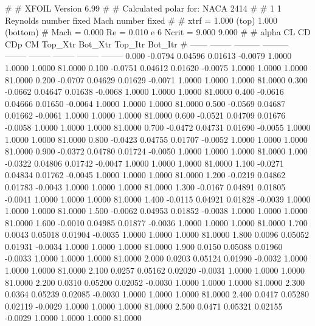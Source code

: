 #  
#       XFOIL         Version 6.99
#  
# Calculated polar for: NACA 2414                                       
#  
# 1 1 Reynolds number fixed          Mach number fixed         
#  
# xtrf =   1.000 (top)        1.000 (bottom)  
# Mach =   0.000     Re =     0.010 e 6     Ncrit =   9.000  9.000
#  
#   alpha    CL        CD       CDp       CM     Top_Xtr  Bot_Xtr  Top_Itr  Bot_Itr
#  ------ -------- --------- --------- -------- -------- -------- -------- --------
   0.000  -0.0794   0.04596   0.01613  -0.0079   1.0000   1.0000   1.0000  81.0000
   0.100  -0.0751   0.04612   0.01620  -0.0075   1.0000   1.0000   1.0000  81.0000
   0.200  -0.0707   0.04629   0.01629  -0.0071   1.0000   1.0000   1.0000  81.0000
   0.300  -0.0662   0.04647   0.01638  -0.0068   1.0000   1.0000   1.0000  81.0000
   0.400  -0.0616   0.04666   0.01650  -0.0064   1.0000   1.0000   1.0000  81.0000
   0.500  -0.0569   0.04687   0.01662  -0.0061   1.0000   1.0000   1.0000  81.0000
   0.600  -0.0521   0.04709   0.01676  -0.0058   1.0000   1.0000   1.0000  81.0000
   0.700  -0.0472   0.04731   0.01690  -0.0055   1.0000   1.0000   1.0000  81.0000
   0.800  -0.0423   0.04755   0.01707  -0.0052   1.0000   1.0000   1.0000  81.0000
   0.900  -0.0372   0.04780   0.01724  -0.0050   1.0000   1.0000   1.0000  81.0000
   1.000  -0.0322   0.04806   0.01742  -0.0047   1.0000   1.0000   1.0000  81.0000
   1.100  -0.0271   0.04834   0.01762  -0.0045   1.0000   1.0000   1.0000  81.0000
   1.200  -0.0219   0.04862   0.01783  -0.0043   1.0000   1.0000   1.0000  81.0000
   1.300  -0.0167   0.04891   0.01805  -0.0041   1.0000   1.0000   1.0000  81.0000
   1.400  -0.0115   0.04921   0.01828  -0.0039   1.0000   1.0000   1.0000  81.0000
   1.500  -0.0062   0.04953   0.01852  -0.0038   1.0000   1.0000   1.0000  81.0000
   1.600  -0.0010   0.04985   0.01877  -0.0036   1.0000   1.0000   1.0000  81.0000
   1.700   0.0043   0.05018   0.01904  -0.0035   1.0000   1.0000   1.0000  81.0000
   1.800   0.0096   0.05052   0.01931  -0.0034   1.0000   1.0000   1.0000  81.0000
   1.900   0.0150   0.05088   0.01960  -0.0033   1.0000   1.0000   1.0000  81.0000
   2.000   0.0203   0.05124   0.01990  -0.0032   1.0000   1.0000   1.0000  81.0000
   2.100   0.0257   0.05162   0.02020  -0.0031   1.0000   1.0000   1.0000  81.0000
   2.200   0.0310   0.05200   0.02052  -0.0030   1.0000   1.0000   1.0000  81.0000
   2.300   0.0364   0.05239   0.02085  -0.0030   1.0000   1.0000   1.0000  81.0000
   2.400   0.0417   0.05280   0.02119  -0.0029   1.0000   1.0000   1.0000  81.0000
   2.500   0.0471   0.05321   0.02155  -0.0029   1.0000   1.0000   1.0000  81.0000
